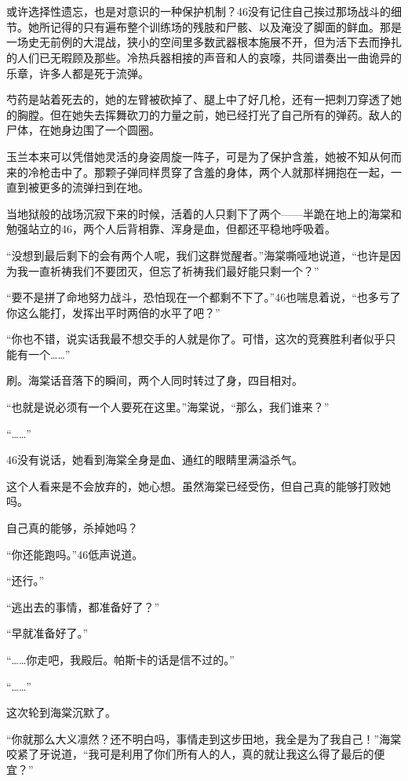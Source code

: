 \section*{}

或许选择性遗忘，也是对意识的一种保护机制？46没有记住自己挨过那场战斗的细节。她所记得的只有遍布整个训练场的残肢和尸骸、以及淹没了脚面的鲜血。那是一场史无前例的大混战，狭小的空间里多数武器根本施展不开，但为活下去而挣扎的人们已无暇顾及那些。冷热兵器相接的声音和人的哀嚎，共同谱奏出一曲诡异的乐章，许多人都是死于流弹。

芍药是站着死去的，她的左臂被砍掉了、腿上中了好几枪，还有一把刺刀穿透了她的胸膛。但在她失去挥舞砍刀的力量之前，她已经打光了自己所有的弹药。敌人的尸体，在她身边围了一个圆圈。

玉兰本来可以凭借她灵活的身姿周旋一阵子，可是为了保护含羞，她被不知从何而来的冷枪击中了。那颗子弹同样贯穿了含羞的身体，两个人就那样拥抱在一起，一直到被更多的流弹扫到在地。

当地狱般的战场沉寂下来的时候，活着的人只剩下了两个——半跪在地上的海棠和勉强站立的46，两个人后背相靠、浑身是血，但都还平稳地呼吸着。

“没想到最后剩下的会有两个人呢，我们这群觉醒者。”海棠嘶哑地说道，“也许是因为我一直祈祷我们不要团灭，但忘了祈祷我们最好能只剩一个？”

“要不是拼了命地努力战斗，恐怕现在一个都剩不下了。”46也喘息着说，“也多亏了你这么能打，发挥出平时两倍的水平了吧？”

“你也不错，说实话我最不想交手的人就是你了。可惜，这次的竞赛胜利者似乎只能有一个……”

刷。海棠话音落下的瞬间，两个人同时转过了身，四目相对。

“也就是说必须有一个人要死在这里。”海棠说，“那么，我们谁来？”

“……”

46没有说话，她看到海棠全身是血、通红的眼睛里满溢杀气。

这个人看来是不会放弃的，她心想。虽然海棠已经受伤，但自己真的能够打败她吗。

自己真的能够，杀掉她吗？

“你还能跑吗。”46低声说道。

“还行。”

“逃出去的事情，都准备好了？”

“早就准备好了。”

“……你走吧，我殿后。帕斯卡的话是信不过的。”

“……”

这次轮到海棠沉默了。

“你就那么大义凛然？还不明白吗，事情走到这步田地，我全是为了我自己！”海棠咬紧了牙说道，“我可是利用了你们所有人的人，真的就让我这么得了最后的便宜？”


